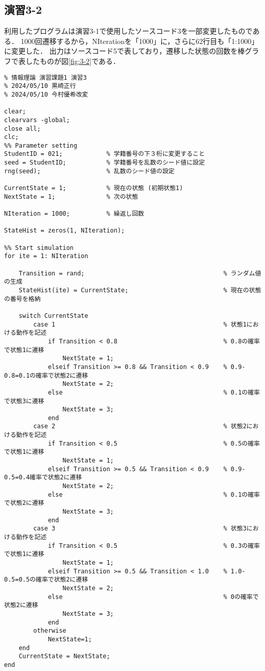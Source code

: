 \documentclass[documentclass]{jsarticle}
\begin{document}
\subsection*{演習3-2}
利用したプログラムは演習3-1で使用したソースコード3を一部変更したものである．
1000回遷移するから，NIterationを「1000」に，さらに62行目も「1:1000」に変更した．
出力はソースコード5で表しており，遷移した状態の回数を棒グラフで表したものが図\ref*{fig:3-2}である．
\begin{lstlisting}[caption=1000回遷移させるためのプログラム]
  % 九州工業大学情報工学部情報・通信工学科3年
% 情報理論 演習課題1 演習3
% 2024/05/10 黒崎正行
% 2024/05/10 今村優希改変

clear;                                 
clearvars -global;                    
close all;                            
clc;                                   
%% Parameter setting
StudentID = 021;            % 学籍番号の下３桁に変更すること
seed = StudentID;           % 学籍番号を乱数のシード値に設定
rng(seed);                  % 乱数のシード値の設定

CurrentState = 1;           % 現在の状態 (初期状態1)
NextState = 1;              % 次の状態 

NIteration = 1000;          % 繰返し回数

StateHist = zeros(1, NIteration);

%% Start simulation
for ite = 1: NIteration

    Transition = rand;                                      % ランダム値の生成
    StateHist(ite) = CurrentState;                          % 現在の状態の番号を格納

    switch CurrentState
        case 1                                              % 状態1における動作を記述
            if Transition < 0.8                             % 0.8の確率で状態1に遷移
                NextState = 1;
            elseif Transition >= 0.8 && Transition < 0.9    % 0.9-0.8=0.1の確率で状態2に遷移
                NextState = 2;
            else                                            % 0.1の確率で状態3に遷移
                NextState = 3;
            end
        case 2                                              % 状態2における動作を記述
            if Transition < 0.5                             % 0.5の確率で状態1に遷移
                NextState = 1;
            elseif Transition >= 0.5 && Transition < 0.9    % 0.9-0.5=0.4確率で状態2に遷移
                NextState = 2;
            else                                            % 0.1の確率で状態2に遷移
                NextState = 3;
            end
        case 3                                              % 状態3における動作を記述
            if Transition < 0.5                             % 0.3の確率で状態1に遷移
                NextState = 1;
            elseif Transition >= 0.5 && Transition < 1.0    % 1.0-0.5=0.5の確率で状態2に遷移
                NextState = 2;
            else                                            % 0の確率で状態2に遷移
                NextState = 3;
            end
        otherwise
            NextState=1;
    end
    CurrentState = NextState;
end


\end{lstlisting}
\end{document}
